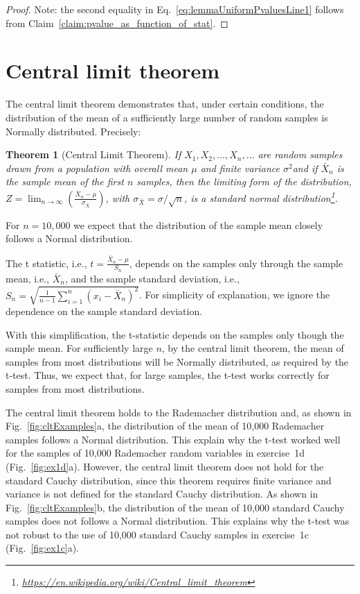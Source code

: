 \documentclass[12pt]{article}
\newtheorem{theorem}{Theorem}
\begin{document}
\begin{appendices}
\begin{proof}
Note: the second equality in Eq.~\ref{eq:lemmaUniformPvaluesLine1} follows
from Claim~\ref{claim:pvalue_as_function_of_stat}.

\end{proof}

\section{Central limit theorem}
\label{sec:clt}

The central limit theorem demonstrates that, under certain conditions, the
distribution of the mean of a sufficiently large number of random samples
is Normally distributed. Precisely:

\begin{theorem}[Central Limit Theorem]

If $X_{1},X_{2},\dots ,X_{n},\dots$ are random samples drawn from a population
    with overall mean $\mu$ and finite variance $\sigma^{2}$and if $\bar
    {X}_{n}$ is the sample mean of the first $n$ samples, then the limiting
    form of the distribution,
    $Z=\lim_{n\to\infty}\left(\frac{\bar{X}_{n}-\mu}{\sigma_{\bar{X}}}\right)$,
    with $\sigma _{\bar{X}}=\sigma/\sqrt{n}$, is a standard normal
    distribution\footnote{\url{https://en.wikipedia.org/wiki/Central_limit_theorem}}.

\end{theorem}

For $n=10,000$ we expect that the distribution of the sample mean closely
follows a Normal distribution.

The t statistic, i.e., $t=\frac{\bar{X}_n-\mu}{S_n}$, depends on the samples
only through the sample mean, i.e., $\bar{X}_n$, and the sample standard
deviation, i.e.,
$S_n=\sqrt{\frac{1}{n-1}\sum_{i=1}^n\left(x_i-\bar{X}_n\right)^2}$.  For
simplicity of explanation, we ignore the dependence on the sample standard
deviation.

With this simplification, the t-statistic depends on the samples only though
the sample mean. For sufficiently large $n$, by the central limit theorem, the
mean of samples from most distributions will be Normally distributed, as
required by the t-test. Thus, we expect that, for large samples, the t-test
works correctly for samples from most distributions.

The central limit theorem holds to the Rademacher distribution and, as shown in
Fig.~\ref{fig:cltExamples}a, the distribution of the mean of 10,000 Rademacher
samples follows a Normal distribution. This explain why the t-test worked well
for the samples of 10,000 Rademacher random variables in exercise~1d
(Fig.~\ref{fig:ex1d}a).
%
However, the central limit theorem does not hold for the standard Cauchy
distribution, since this theorem requires finite
variance and variance is not defined for the standard Cauchy distribution. As
shown in Fig.~\ref{fig:cltExamples}b, the distribution of the mean of 10,000
standard Cauchy samples does not follows a Normal distribution.
This explains why the t-test was not robust to the use of 10,000 standard
Cauchy samples in exercise~1c (Fig.~\ref{fig:ex1c}a).


\end{appendices}
\end{document}
